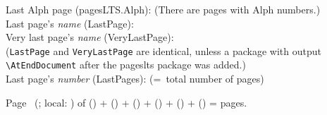 \documentclass[british]{article}
\begin{document}
\noindent Last Alph page (pagesLTS.Alph): 
(There are  pages with Alph numbers.)\\

\noindent Last page's \textit{name} (LastPage): \\

\noindent Very last page's \textit{name} (VeryLastPage): \\
(\texttt{LastPage} and \texttt{VeryLastPage} are identical, unless
a package with output \linebreak
\verb|\AtEndDocument| after the \textsf{pageslts} package was added.)\\

\noindent Last page's \textit{number} (LastPages): 
(=~total number of pages)\\

\medskip

\noindent Page \thepage\ (\theCurrentPage; local: \theCurrentPageLocal) of %
 () + %
 () + %
 () + %
 () + %
 () + %
 () = %
 pages.
\end{document}
